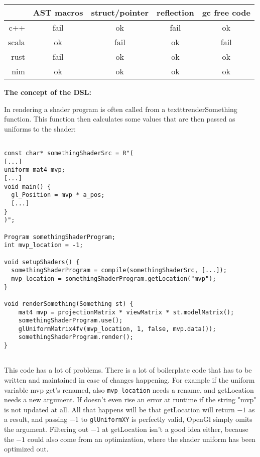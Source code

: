 \documentclass[10pt]{report}
\begin{document}
\vspace{7 mm}

\begin{tabular}{ r | c c c c }
  & AST macros & struct/pointer & reflection & gc free code \\
\hline
c++ & fail & ok & fail & ok \\
scala & ok & fail & ok & fail \\
rust & fail & ok & ok & ok \\
nim & ok & ok & ok & ok\\
\end{tabular}
\vspace{7 mm}

\textbf{The concept of the DSL:}

In rendering a shader program is often called from a texttt{renderSomething} function. This function then calculates some values that are then passed as uniforms to the shader:

\begin{verbatim}

const char* somethingShaderSrc = R"(
[...]
uniform mat4 mvp;
[...]
void main() {
  gl_Position = mvp * a_pos;
  [...]
}
)";

Program somethingShaderProgram;
int mvp_location = -1;

void setupShaders() {
  somethingShaderProgram = compile(somethingShaderSrc, [...]);
  mvp_location = somethingShaderProgram.getLocation("mvp");
}

void renderSomething(Something st) {
    mat4 mvp = projectionMatrix * viewMatrix * st.modelMatrix();
    somethingShaderProgram.use();
    glUniformMatrix4fv(mvp_location, 1, false, mvp.data());
    somethingShaderProgram.render();
}


\end{verbatim}

This code has a lot of problems. There is a lot of boilerplate code that has to be written and maintained in case of changes happening. For example if the uniform variable mvp get's renamed, also \texttt{mvp\_location} needs a rename, and getLocation needs a new argument. If doesn't even rise an error at runtime if the string "mvp" is not updated at all. All that happens will be that getLocation will return $-1$ as a result, and passing $-1$ to \texttt{glUniformXY} is perfectly valid, OpenGl simply omits the argument. Filtering out $-1$ at getLocation isn't a good idea either, because the $-1$ could also come from an optimization, where the shader uniform has been optimized out. 
\end{document}
